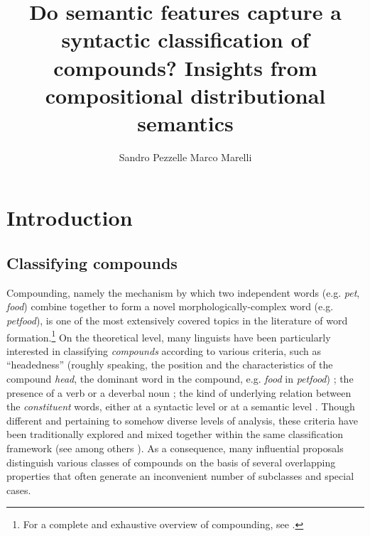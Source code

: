 \documentclass[output=paper]{langsci/langscibook}
\title{Do semantic features capture a syntactic classification of compounds? Insights from compositional distributional semantics}
\author{%
 Sandro Pezzelle\affiliation{Institute for Logic, Language and Computation, University of Amsterdam}
 \lastand
 Marco Marelli\affiliation{Department of Psychology, University of Milano-Bicocca}
}
\begin{document}
\maketitle

\section{Introduction}
\label{sec:introduction}

\subsection{Classifying compounds}\label{sec:class}


Compounding, namely the mechanism by which two independent words (e.g. \emph{pet}, \emph{food}) combine together to form a novel morphologically-complex word (e.g. \emph{petfood}), is one of the most extensively covered topics in the literature of word formation.\footnote{For a complete and exhaustive overview of compounding, see \cite{OHC}.} On the theoretical level, many linguists have been particularly interested in classifying \emph{compounds} according to various criteria, such as ``headedness'' (roughly speaking, the position and the characteristics of the compound \emph{head}, the dominant word in the compound, e.g. \emph{food} in \emph{petfood}) \citep{Bloomfield1933,fabb1998}; the presence of a verb or a deverbal noun \citep{marchand1969}; the kind of underlying relation between the \emph{constituent} words, either at a syntactic level \citep{Bloomfield1933,bally1950,lees1960,SB2005,baroni2006,dressler2006,sbOHC} or at a semantic level \citep{levi1978,warren1978,fanselow1981}. Though different and pertaining to somehow diverse levels of analysis, these criteria have been traditionally explored and mixed together within the same classification framework (see among others \citealt{bauer2001,hasp2002,Booij2005}). As a consequence, many influential proposals distinguish various classes of compounds on the basis of several overlapping properties that often generate an inconvenient number of subclasses and special cases.
\end{document}
